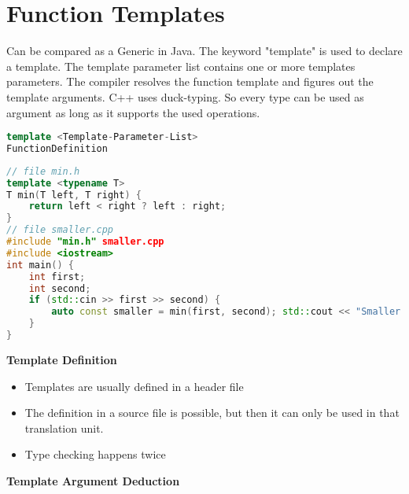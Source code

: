 
\section{Function Templates} 
Can be compared as a Generic in Java. The keyword "template" is used to declare a template. The template parameter list contains one or more templates parameters.
The compiler resolves the function template and figures out the template arguments. C++ uses duck-typing. So every type can be used as argument as long as it supports the used operations.

\begin{lstlisting}[language=C++]
template <Template-Parameter-List>
FunctionDefinition
\end{lstlisting}

\begin{lstlisting}[language=C++]
// file min.h
template <typename T>
T min(T left, T right) {
	return left < right ? left : right;
}
// file smaller.cpp
#include "min.h" smaller.cpp
#include <iostream>
int main() {
	int first;
	int second;
	if (std::cin >> first >> second) {
		auto const smaller = min(first, second); std::cout << "Smaller of " << first << " and " << second << " is: " << smaller << '\n';
	}
}
\end{lstlisting}

\textbf{Template Definition}
\begin{itemize}
  \itemsep -0.5em 
  \item Templates are usually defined in a header file
  \item The definition in a source file is possible, but then it can only be used in that translation unit.
  \item Type checking happens twice
\end{itemize}

\textbf{Template Argument Deduction}
